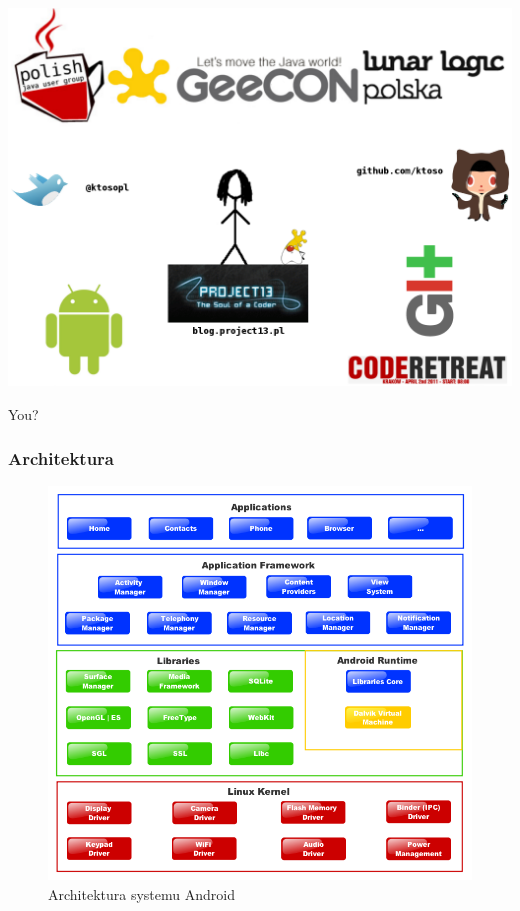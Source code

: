 \begin{frame}
  \centering
  \includegraphics[width=\textwidth,height=\textheight]{images/about_me_slide}
\end{frame}

\begin{frame}
 \begin{center}
  \Huge{You?}
 \end{center}

\end{frame}



\begin{frame}\frametitle{Architektura}

  \begin{figure}[t]
    \includegraphics[height=0.62\textheight,keepaspectratio=true,clip=true]{images/platform}
    \caption{Architektura systemu Android}
  \end{figure}

\end{frame}

